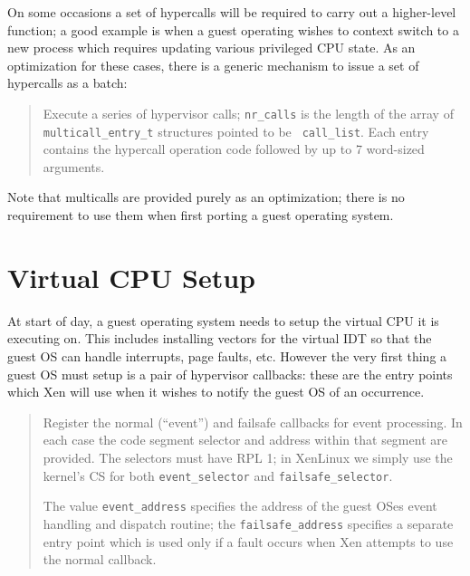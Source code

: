 \documentclass[11pt,twoside,final,openright]{report}
\begin{document}
On some occasions a set of hypercalls will be required to carry
out a higher-level function; a good example is when a guest 
operating wishes to context switch to a new process which 
requires updating various privileged CPU state. As an optimization
for these cases, there is a generic mechanism to issue a set of 
hypercalls as a batch: 

\begin{quote}

Execute a series of hypervisor calls; {\tt nr\_calls} is the length of
the array of {\tt multicall\_entry\_t} structures pointed to be {\tt
call\_list}. Each entry contains the hypercall operation code followed
by up to 7 word-sized arguments.
\end{quote}

Note that multicalls are provided purely as an optimization; there is
no requirement to use them when first porting a guest operating
system.


\section{Virtual CPU Setup} 

At start of day, a guest operating system needs to setup the virtual
CPU it is executing on. This includes installing vectors for the
virtual IDT so that the guest OS can handle interrupts, page faults,
etc. However the very first thing a guest OS must setup is a pair 
of hypervisor callbacks: these are the entry points which Xen will
use when it wishes to notify the guest OS of an occurrence. 

\begin{quote}

Register the normal (``event'') and failsafe callbacks for 
event processing. In each case the code segment selector and 
address within that segment are provided. The selectors must
have RPL 1; in XenLinux we simply use the kernel's CS for both 
{\tt event\_selector} and {\tt failsafe\_selector}.

The value {\tt event\_address} specifies the address of the guest OSes
event handling and dispatch routine; the {\tt failsafe\_address}
specifies a separate entry point which is used only if a fault occurs
when Xen attempts to use the normal callback. 
\end{quote} 
\end{document}
